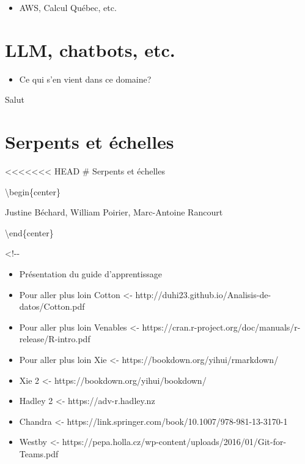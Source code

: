 \documentclass[
  letterpaper,
]{scrbook}
\providecommand{\tightlist}{%
  \setlength{\itemsep}{0pt}\setlength{\parskip}{0pt}}\usepackage{longtable,booktabs,array}
\begin{document}
\begin{itemize}
\tightlist
\item
  AWS, Calcul Québec, etc.
\end{itemize}


\hypertarget{llm-chatbots-etc.}{%
\chapter{LLM, chatbots, etc.}\label{llm-chatbots-etc.}}

\begin{itemize}
\tightlist
\item
  Ce qui s'en vient dans ce domaine?
\end{itemize}

Salut


\hypertarget{serpents-et-uxe9chelles}{%
\chapter{Serpents et échelles}\label{serpents-et-uxe9chelles}}

<<<<<<< HEAD
\# Serpents et échelles

\textbackslash begin\{center\}

Justine Béchard, William Poirier, Marc-Antoine Rancourt

\textbackslash end\{center\}

\textless!-\/-

\begin{itemize}
\item
  Présentation du guide d'apprentissage
\item
  Pour aller plus loin Cotton \textless-
  http://duhi23.github.io/Analisis-de-datos/Cotton.pdf
\item
  Pour aller plus loin Venables \textless-
  https://cran.r-project.org/doc/manuals/r-release/R-intro.pdf
\item
  Pour aller plus loin Xie \textless-
  https://bookdown.org/yihui/rmarkdown/
\item
  Xie 2 \textless- https://bookdown.org/yihui/bookdown/
\item
  Hadley 2 \textless- https://adv-r.hadley.nz
\item
  Chandra \textless-
  https://link.springer.com/book/10.1007/978-981-13-3170-1
\item
  Westby \textless-
  https://pepa.holla.cz/wp-content/uploads/2016/01/Git-for-Teams.pdf
\end{itemize}
\end{document}

